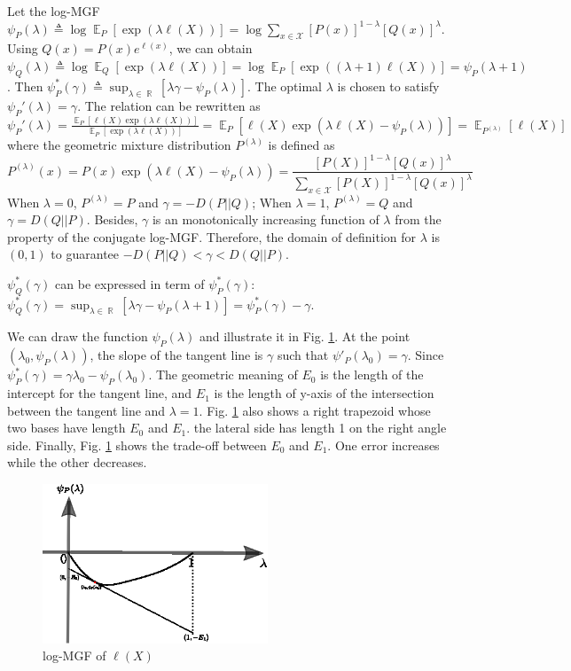 \documentclass{article}
\DeclareMathOperator{\E}{\mathbb{E}}
\DeclareMathOperator{\R}{\mathbb{R}}
\begin{document}
Let the log-MGF $\psi_P(\lambda)\triangleq \log \E_{P}
[\exp(\lambda \ell(X))] = \log \sum_{x\in\mathcal{X}}
[P(x)]^{1-\lambda}[Q(x)]^{\lambda}$.
Using $Q(x)=P(x)e^{\ell(x)}$, we can obtain
$\psi_Q(\lambda)\triangleq \log \E_{Q}
[\exp(\lambda \ell(X))] = \log \E_{P}
[\exp((\lambda +1)\ell(X))] = \psi_P(\lambda + 1)$.
Then
$\psi_P^*(\gamma)\triangleq \sup_{\lambda \in \R} [\lambda \gamma - \psi_P(\lambda)]$.
The optimal $\lambda$ is chosen to satisfy
$\psi_P'(\lambda) = \gamma$.
The relation can be rewritten as
$\psi_P'(\lambda) = \frac{\E_{P}
[\ell(X)\exp(\lambda \ell(X))]}{\E_{P}
[\exp(\lambda \ell(X))]}
=\E_{P}
[\ell(X)\exp(\lambda \ell(X)-\psi_P(\lambda))]
=\E_{P^{(\lambda)}}[\ell(X)]$ where the geometric mixture distribution
$P^{(\lambda)}$ is defined as 
\begin{equation}\label{eq:plambda}
    P^{(\lambda)}(x) = P(x)\exp(\lambda \ell(X)-\psi_P(\lambda))
    = \frac{
[P(X)]^{1-\lambda}[Q(x)]^{\lambda}
}{\sum_{x\in\mathcal{X}}
[P(X)]^{1-\lambda}[Q(x)]^{\lambda}}
\end{equation}
When $\lambda = 0$, $P^{(\lambda)} = P$ and $\gamma = -D(P||Q)$;
When $\lambda = 1$, $P^{(\lambda)} = Q$ and $\gamma = D(Q||P)$.
Besides, $\gamma$ is an monotonically increasing function of
$\lambda$ from the property of the conjugate log-MGF.
Therefore, the domain of definition for $\lambda$ is $(0,1)$ to guarantee $-D(P||Q) < \gamma < D(Q||P)$.

$\psi_Q^*(\gamma)$ can be expressed in term of
$\psi_P^*(\gamma)$:
$\psi_Q^*(\gamma)
=\sup_{\lambda \in \R} [\lambda \gamma - \psi_P(\lambda+1)]
=\psi_P^*(\gamma)-\gamma
$.

We can draw the function $\psi_P(\lambda)$ and illustrate it
in Fig. \ref{fig:psiell}. At the point $(\lambda_0, \psi_P(\lambda))$,
the slope of the tangent line is $\gamma$ such that
$\psi'_P(\lambda_0)=\gamma$. Since $\psi_P^*(\gamma) = \gamma \lambda_0 - \psi_P(\lambda_0)$. The geometric meaning of $E_0$ is the length
of the intercept for the tangent line, and $E_1$ is the length of
y-axis of the intersection between the tangent line and $\lambda=1$.
Fig. \ref{fig:psiell} also shows a right trapezoid whose
two bases have length $E_0$ and $E_1$. the lateral side
has length 1 on the right angle side. Finally, Fig.
\ref{fig:psiell} shows the trade-off between $E_0$ and $E_1$.
One error increases while the other decreases.
\begin{figure}[!ht]
    \centering
    \includegraphics[width=0.6\textwidth]{e0e1.eps}
    \caption{log-MGF of $\ell(X)$}
    \label{fig:psiell}
\end{figure}
\end{document}
